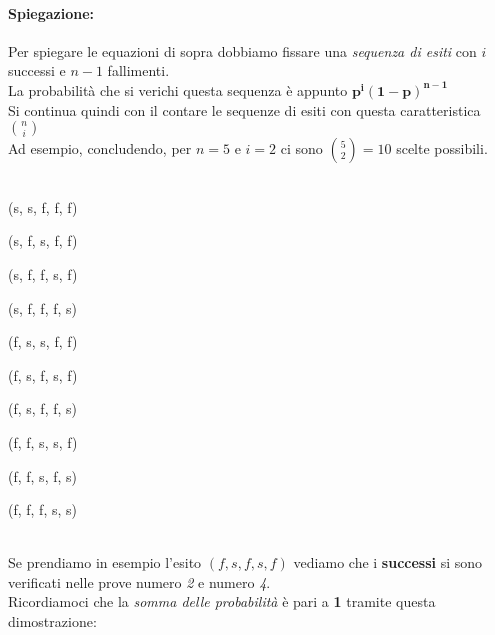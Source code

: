 \documentclass[]{article}
\begin{document}
    \paragraph{Spiegazione:} Per spiegare le equazioni di sopra dobbiamo fissare una \textit{sequenza di esiti} con $i$ successi e $n - 1$ fallimenti. \\
    La probabilità che si verichi questa sequenza è appunto $\boldsymbol{p^i(1-p)^{n-1}}$ \\
    Si continua quindi con il contare le sequenze di esiti con questa caratteristica $\binom{n}{i}$ \\ 
    Ad esempio, concludendo, per $n = 5$ e $i = 2$ ci sono $\binom{5}{2} = 10$ scelte possibili. \\ \\
    \begin{minipage}{0.2\textwidth}
        (s, s, f, f, f)
    \end{minipage}
    \begin{minipage}{0.2\textwidth}
        (s, f, s, f, f)
    \end{minipage}
    \begin{minipage}{0.2\textwidth}
        (s, f, f, s, f)
    \end{minipage}
    \begin{minipage}{0.2\textwidth}
        (s, f, f, f, s)
    \end{minipage}
    \begin{minipage}{0.2\textwidth}
        (f, s, s, f, f)
    \end{minipage}
    \begin{minipage}{0.2\textwidth}
        (f, s, f, s, f)
    \end{minipage}
    \begin{minipage}{0.2\textwidth}
        (f, s, f, f, s)
    \end{minipage}
    \begin{minipage}{0.2\textwidth}
        (f, f, s, s, f)
    \end{minipage}
    \begin{minipage}{0.2\textwidth}
        (f, f, s, f, s)
    \end{minipage}
    \begin{minipage}{0.2\textwidth}
        (f, f, f, s, s)
    \end{minipage} \\
    \linebreak
    Se prendiamo in esempio l'esito $(f, s, f, s, f)$ vediamo che i \textbf{successi} 
    si sono verificati nelle prove numero \textit{2} e numero \textit{4}. \\
    Ricordiamoci che la \textit{somma delle probabilità} è pari a \textbf{1} tramite questa dimostrazione:
\end{document}
